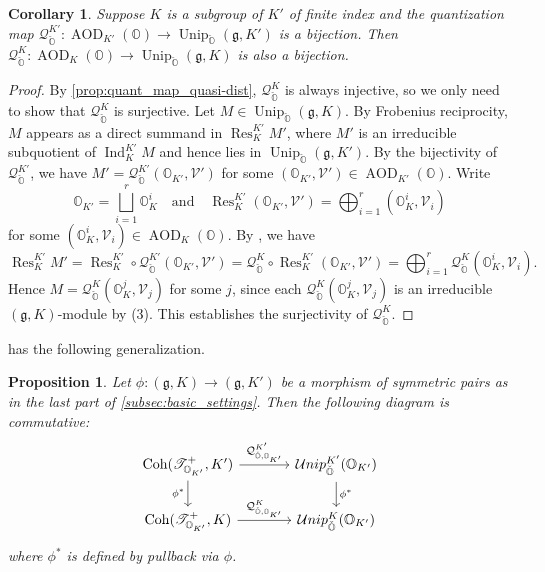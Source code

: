 \documentclass[11pt, a4paper]{amsart}
\newcommand{\g}{\mathfrak{g}}
\newcommand{\orb}{\mathbb{O}}
\newcommand{\orbk}{\orb_{K}}
\newcommand{\ckorb}{\check{\orb}}
\newcommand{\cV}{\mathcal{V}}
\DeclareMathOperator{\Ind}{Ind}
\DeclareMathOperator{\AOD}{AOD}
\DeclareMathOperator{\Unip}{Unip}
\DeclareMathOperator{\Coh}{Coh}
\DeclareMathOperator{\res}{Res}
\newcommand{\AODK}{\AOD_K}
\newcommand{\UnipOv}{\Unip_{\ckorb}}
\newcommand{\cUnipOv}{\mathcal{U}nip_{\ckorb}}
\newcommand{\TT}{\mathscr{T}}
\newcommand{\quan}{\mathcal{Q}}
\newtheorem{Prop}[Thm]{Proposition}
\newtheorem{Cor}[Thm]{Corollary}
\theoremstyle{definition}
\numberwithin{equation}{section}
\begin{document}
\begin{Cor} \label{cor:quant_res_bij}
	Suppose $K$ is a subgroup of $K'$ of finite index and the quantization map $\quan_{\ckorb}^{K'}: \AOD_{K'}(\orb) \to \UnipOv(\g, K')$ is a bijection. Then $\quan_{\ckorb}^K: \AODK(\orb) \to \UnipOv(\g, K)$ is also a bijection.
\end{Cor}

\begin{proof}
	By \cref{prop:quant_map_quasi-dist}, $\quan_{\ckorb}^K$ is always injective, so we only need to show that $\quan_{\ckorb}^K$ is surjective. Let $M \in \UnipOv(\g, K)$. By Frobenius reciprocity, $M$ appears as a direct summand in $\res_{K}^{K'} M'$, where $M'$ is an irreducible subquotient of $\Ind_{K}^{K'} M$ and hence lies in $\UnipOv(\g, K')$. By the bijectivity of $\quan_{\ckorb}^{K'}$, we have $M' = \quan_{\ckorb}^{K'}(\orb_{K'}, \cV')$ for some $(\orb_{K'}, \cV') \in \AOD_{K'}(\orb)$. Write
	\[
		\orb_{K'} = \bigsqcup_{i=1}^r \orb_{K}^i 
		\quad \text{and} \quad 
		\res_{K}^{K'}(\orb_{K'}, \cV') = \bigoplus_{i=1}^r (\orbk^i, \cV_i)\]
	for some $(\orbk^i, \cV_i) \in \AODK(\orb)$. By , we have
		\[ \res_{K}^{K'} M' = \res_{K}^{K'} \circ \quan_{\ckorb}^{K'}(\orb_{K'}, \cV') = \quan_{\ckorb}^K \circ \res_{K}^{K'}(\orb_{K'}, \cV') = \bigoplus_{i=1}^r \quan_{\ckorb}^K(\orbk^i, \cV_i).\]
	Hence $M = \quan_{\ckorb}^K(\orbk^j, \cV_j)$ for some $j$, since each $\quan_{\ckorb}^K(\orbk^j, \cV_j)$ is an irreducible $(\g,K)$-module by  (3). This establishes the surjectivity of $\quan_{\ckorb}^K$. 
\end{proof}

 has the following generalization.

\begin{Prop} \label{prop:quant_pullback}
	Let $\phi: (\g,K) \to (\g,K')$ be a morphism of symmetric pairs as in the last part of \cref{subsec:basic_settings}. Then the following diagram is commutative:
	\begin{equation} \label{diag:quan_pullback}
		\begin{tikzcd}[column sep = large]
			\Coh(\TT^+_{\orb_{K'}},K') \arrow[r, "\quan_{\ckorb, \orb_{K'}}^{K'}"] \arrow[d, swap, "\phi^*"] & \cUnipOv^{K'}(\orb_{K'})  \arrow[d, "\phi^*"] \\
			\Coh(\TT^+_{\orb_{K'}},K) \arrow[r, "\quan_{\ckorb, \orb_{K'}}^K"] & \cUnipOv^K(\orb_{K'})
		\end{tikzcd}
	\end{equation}
	where $\phi^*$ is defined by pullback via $\phi$.
\end{Prop}
\end{document}
